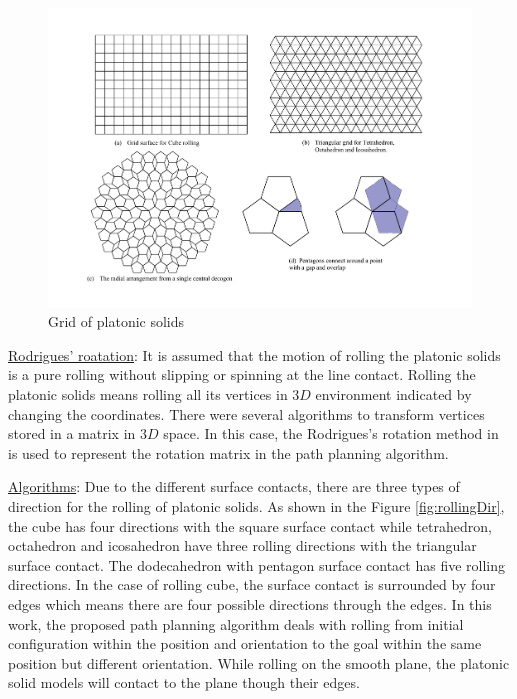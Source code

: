 %
\begin{figure}[h]
\centering
	\includegraphics[width=1\textwidth]{image/gridPlatonic.pdf}
	\caption{Grid of platonic solids}
	\label{fig:gridPlatonic}
\end{figure}


\noindent\uline{Rodrigues' roatation}: It is assumed that the motion of rolling the platonic solids is a pure rolling without slipping or spinning at the line contact.
Rolling the platonic solids means rolling all its vertices in $3D$ environment indicated by changing the coordinates. There were several algorithms to transform vertices stored in a matrix in $3D$ space. In this case, the Rodrigues's rotation method in \cite{Dai_Rodrigues_2015} is used to represent the rotation matrix in the path planning algorithm. 


%
\clearpage
\newpage
\noindent\uline{Algorithms}:
Due to the different surface contacts, there are three types of direction for the rolling of platonic solids. As shown in the Figure \ref{fig:rollingDir}, the cube has four directions with the square surface contact while tetrahedron, octahedron and icosahedron have three rolling directions with the triangular surface contact. The dodecahedron with pentagon surface contact has five rolling directions. In the case of rolling cube, the surface contact is surrounded by four edges which means there are four possible directions through the edges. In this work, the proposed path planning algorithm deals with rolling from initial configuration within the position and orientation to the goal within the same position but different orientation. While rolling on the smooth plane, the platonic solid models will contact to the plane though their edges.\\

